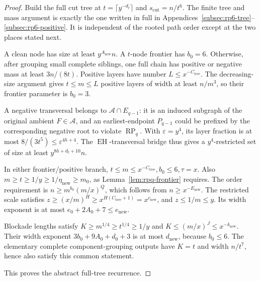 \documentclass[11pt,a4paper]{article}
\theoremstyle{definition}
\theoremstyle{remark}
\numberwithin{equation}{section}
\DeclareMathOperator{\RP}{RP}
\begin{document}
\begin{proof}
Build the full cut tree at \(t=\lceil y^{-d_{t}}\rceil\) and \(s_{\mathrm{cut}}=n/t^{6}\). The finite tree and mass argument is exactly the one written in full in Appendices~\ref{subsec:rp6-tree}--\ref{subsec:rp6-positive}. It is independent of the rooted path order except at the two places stated next.

A clean node has size at least \(y^{A_{\mathrm{new}}} n\). A \(t\)-node frontier has \(b_{0}=6\). Otherwise, after grouping small complete siblings, one full chain has positive or negative mass at least \(3n/(8t)\). Positive layers have number \(L\le\allowbreak x^{-C_{\mathrm{tree}}}\). The decreasing-size argument gives \(t\le\allowbreak m\le\allowbreak L\) positive layers of width at least \(n/m^{3}\), so their frontier parameter is \(b_{0}=3\).

A negative transversal belongs to \(\mathcal A\cap  E_{q-1}\): it is an induced subgraph of the original ambient \(F\in\mathcal A\), and an earliest-endpoint \(P_{q-1}\) could be prefixed by the corresponding negative root to violate \(\RP_{q}\). With \(\varepsilon=y^{4}\), its layer fraction is at most \(8/(3t^{5})\le\allowbreak \varepsilon^{4h+4}\). The \(\operatorname{EH}\)-transversal bridge thus gives a \(y^{4}\)-restricted set of size at least \(y^{8h+d_{t}+10}n\).

In either frontier/positive branch, \(t\le\allowbreak m\le\allowbreak x^{-C_{\mathrm{tree}}},\allowbreak  b_{0}\le\allowbreak 6,\allowbreak  \tau=x\). Also \(m\ge t\ge 1/y\ge 1/\eta_{\mathrm{new}}\ge m_{0}\), as Lemma~\ref{lem:rpq-frontier} requires. The order requirement is \(n\ge\allowbreak m^{b_{0}} (m/x)^{Q}\), which follows from \(n\ge\allowbreak x^{-E_{\mathrm{new}}}\). The restricted scale satisfies \(z\ge\allowbreak (x/m)^{H}\ge\allowbreak x^{H(C_{\mathrm{tree}}+1)}=x^{c_{\mathrm{new}}}\), and \(z\le\allowbreak 1/m\le\allowbreak y\). Its width exponent is at most \(e_{0}+2A_{0}+7\le\allowbreak e_{\mathrm{new}}\).

Blockade lengths satisfy \(K\ge\allowbreak m^{1/4}\ge\allowbreak t^{1/4}\ge\allowbreak 1/y\) and \(K\le\allowbreak (m/x)^{J}\le\allowbreak x^{-k_{\mathrm{new}}}\). Their width exponent \(3b_{0}+9A_{0}+d_{0}+3\) is at most \(d_{\mathrm{new}}\), because \(b_{0}\le6\). The elementary complete component-grouping outputs have \(K=t\) and width \(n/t^{7}\), hence also satisfy this common statement.

This proves the abstract full-tree recurrence.
\end{proof}
\end{document}

